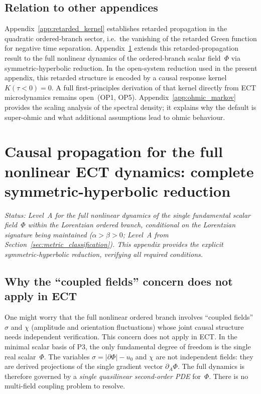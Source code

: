 \documentclass[11pt,a4paper]{article}
\numberwithin{equation}{section}
\begin{document}
\subsection*{Relation to other appendices}

Appendix~\ref{app:retarded_kernel} establishes retarded propagation in
the quadratic ordered-branch sector, i.e.\ the vanishing of the
retarded Green function for negative time separation.
Appendix~\ref{app:causal_hyperbolic} extends this retarded-propagation
result to the full nonlinear dynamics of the ordered-branch scalar
field~$\Phi$ via symmetric-hyperbolic reduction.
In the open-system reduction used in the present appendix, this
retarded structure is encoded by a causal response kernel
$K(\tau<0)=0$.
A full first-principles derivation of that kernel directly from ECT
microdynamics remains open~(OP1, OP5).
Appendix~\ref{app:ohmic_markov} provides the scaling analysis of the
spectral density; it explains why the default is super-ohmic and
what additional assumptions lead to ohmic behaviour.






\section{Causal propagation for the full nonlinear ECT dynamics:
complete symmetric-hyperbolic reduction}
\label{app:causal_hyperbolic}

\textit{Status: Level~A for the full nonlinear dynamics of the single
fundamental scalar field~$\Phi$ within the Lorentzian ordered branch,
conditional on the Lorentzian signature being maintained
($\alpha>\beta>0$; Level~A from Section~\ref{sec:metric_classification}).
This appendix provides the explicit symmetric-hyperbolic reduction,
verifying all required conditions.}

\subsection*{Why the ``coupled fields'' concern does not apply in ECT}

One might worry that the full nonlinear ordered branch involves
``coupled fields'' $\sigma$ and $\chi$ (amplitude and orientation
fluctuations) whose joint causal structure needs independent
verification.
This concern does not apply in ECT.
In the minimal scalar basis of P3, the only fundamental degree of
freedom is the single real scalar~$\Phi$.
The variables $\sigma = |\partial\Phi| - u_0$ and $\chi$ are not
independent fields: they are derived projections of the single gradient
vector $\partial_A\Phi$.
The full dynamics is therefore governed by a \emph{single quasilinear
second-order PDE} for~$\Phi$.
There is no multi-field coupling problem to resolve.
\end{document}
